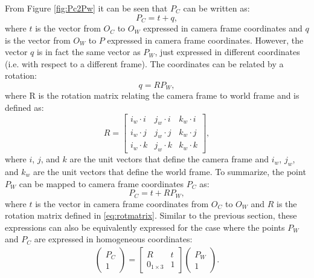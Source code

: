 From Figure \ref{fig:Pc2Pw} it can be seen that $P_C$ can be written as:
\begin{equation}
P_{C} = t + q,
\end{equation}
where $t$ is the vector from $O_C$ to $O_W$ expressed in camera frame coordinates and $q$ is the vector from $O_W$ to $P$ expressed in camera frame coordinates. However, the vector $q$ is in fact the same vector as $P_W$, just expressed in different coordinates (i.e. with respect to a different frame). The coordinates can be related by a rotation:
\begin{equation}
q = RP_W,
\end{equation}
where R is the rotation matrix relating the camera frame to world frame and is defined as:
\begin{equation} \label{eq:rotmatrix}
R =
\begin{bmatrix}
i_w \cdot i & j_w \cdot i & k_w \cdot i \\
i_w \cdot j & j_w \cdot j & k_w \cdot j \\
i_w \cdot k & j_w \cdot k & k_w \cdot k
\end{bmatrix},
\end{equation}
where $i$, $j$, and $k$ are the unit vectors that define the camera frame and $i_w$, $j_w$, and $k_w$ are the unit vectors that define the world frame. To summarize, the point $P_W$ can be mapped to camera frame coordinates $P_C$ as:
\begin{equation}
P_C = t + R P_W,
\end{equation}
where $t$ is the vector in camera frame coordinates from $O_C$ to $O_W$ and $R$ is the rotation matrix defined in \eqref{eq:rotmatrix}.
Similar to the previous section, these expressions can also be equivalently expressed for the case where the points $P_W$ and $P_C$ are expressed in homogeneous coordinates:
\begin{equation} \label{eq:Pw2Pchomo}
\begin{split}
\begin{pmatrix}
    P_C \\ 1
    \end{pmatrix} = \begin{bmatrix}
R & t \\
0_{1\times3} & 1
\end{bmatrix}
\begin{pmatrix}
P_W \\ 1
\end{pmatrix}.
\end{split}
\end{equation}


